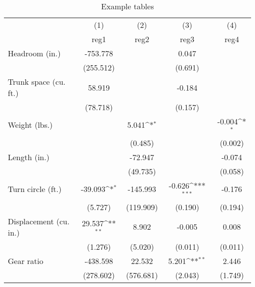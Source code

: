 \begin{table}[htbp]\centering
\def\sym#1{\ifmmode^{#1}\else\(^{#1}\)\fi}
\caption{Example tables \label{tab-exp}}
\begin{tabular}{l*{4}{c}}
\hline\hline
                    &\multicolumn{1}{c}{(1)}         &\multicolumn{1}{c}{(2)}         &\multicolumn{1}{c}{(3)}         &\multicolumn{1}{c}{(4)}         \\
                    &        reg1         &        reg2         &        reg3         &        reg4         \\
\hline
Headroom (in.)      &    -753.778         &                     &       0.047         &                     \\
                    &   (255.512)         &                     &     (0.691)         &                     \\
Trunk space (cu. ft.)&      58.919         &                     &      -0.184         &                     \\
                    &    (78.718)         &                     &     (0.157)         &                     \\
Weight (lbs.)       &                     &       5.041\sym{*}  &                     &      -0.004\sym{*}  \\
                    &                     &     (0.485)         &                     &     (0.002)         \\
Length (in.)        &                     &     -72.947         &                     &      -0.074         \\
                    &                     &    (49.735)         &                     &     (0.058)         \\
Turn circle (ft.)   &     -39.093\sym{*}  &    -145.993         &      -0.626\sym{***}&      -0.176         \\
                    &     (5.727)         &   (119.909)         &     (0.190)         &     (0.194)         \\
Displacement (cu. in.)&      29.537\sym{**} &       8.902         &      -0.005         &       0.008         \\
                    &     (1.276)         &     (5.020)         &     (0.011)         &     (0.011)         \\
Gear ratio          &    -438.598         &      22.532         &       5.201\sym{**} &       2.446         \\
                    &   (278.602)         &   (576.681)         &     (2.043)         &     (1.749)         \\

\end{tabular}
\end{table}
